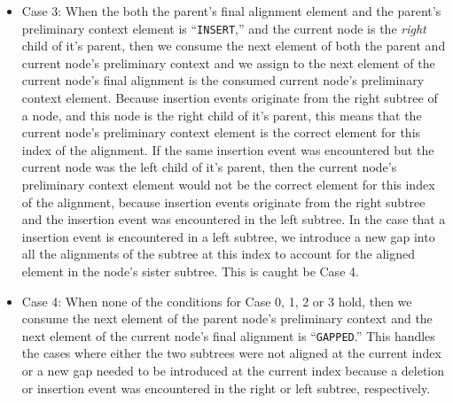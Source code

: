 \documentclass{bmcart}
\begin{document}
\begin{itemize}
  \item Case 3: When the both the parent's final alignment element and the parent's preliminary context element is ``\texttt{INSERT},'' and the current node is the \textit{right} child of it's parent, then we consume the next element of both the parent and current node's preliminary context and we assign to the next element of the current node's final alignment is the consumed current node's preliminary context element.
  Because insertion events originate from the right subtree of a node, and this node is the right child of it's parent, this means that the current node's preliminary context element is the correct element for this index of the alignment.
  If the same insertion event was encountered but the current node was the left child of it's parent, then the current node's preliminary context element would not be the correct element for this index of the alignment, because insertion events originate from the right subtree and the insertion event was encountered in the left subtree.
  In the case that a insertion event is encountered in a left subtree, we introduce a new gap into all the alignments of the subtree at this index to account for the aligned element in the node's sister subtree.
  This is caught be Case 4.
  
  \item Case 4: When none of the conditions for Case 0, 1, 2 or 3 hold, then we consume the next element of the parent node's preliminary context and the next element of the current node's final alignment is ``\texttt{GAPPED}.''
  This handles the cases where either the two subtrees were not aligned at the current index or a new gap needed to be introduced at the current index because a deletion or insertion event was encountered in the right or left subtree, respectively. 

\end{itemize}
\end{document}
